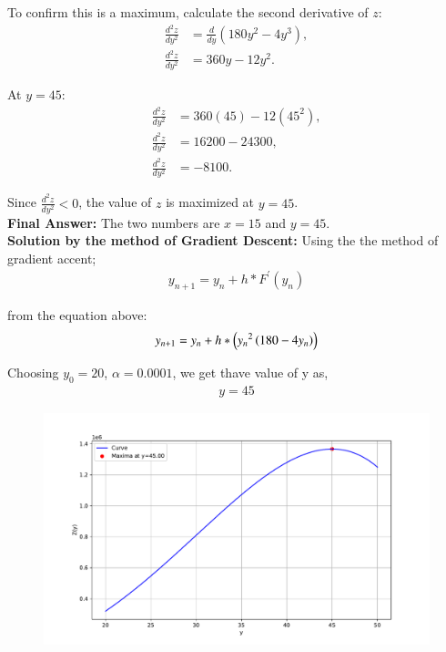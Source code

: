 \documentclass[journal,12pt,onecolumn]{IEEEtran}
\theoremstyle{remark}
\begin{document}
To confirm this is a maximum, calculate the second derivative of $z$:  
\begin{align}
    \frac{d^2z}{dy^2} &= \frac{d}{dy}(180y^2 - 4y^3), \\
    \frac{d^2z}{dy^2} &= 360y - 12y^2.
\end{align}

At $y = 45$:  
\begin{align}
    \frac{d^2z}{dy^2} &= 360(45) - 12(45^2), \\
    \frac{d^2z}{dy^2} &= 16200 - 24300, \\
    \frac{d^2z}{dy^2} &= -8100.
\end{align}

Since $\frac{d^2z}{dy^2} < 0$, the value of $z$ is maximized at $y = 45$. \\

\textbf{Final Answer:} The two numbers are $x = 15$ and $y = 45$.\\


\textbf{Solution by the method of Gradient Descent:}
Using the the method of gradient accent;
\begin{align}
	y_{n+1}=y_n+h*F^{'}(y_n)
\end{align}

from the equation above:
\begin{align}
	y_{n+1}=y_n+h*\left({y_n}^2\left(180-4y_n\right)\right)
\end{align}
 
Choosing $y_0=20$, $\alpha=0.0001$, we get thave value of y as,
\begin{align}
	y=45
\end{align}

\begin{figure}[h]
	\centering
	\includegraphics[width=\columnwidth]{figs/fig.pdf}
\end{figure}
\end{document}
